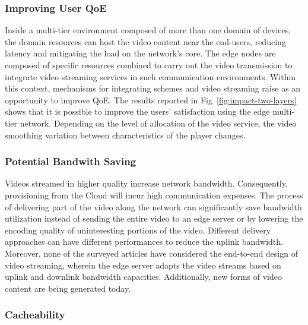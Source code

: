 \subsubsection{Improving User QoE}

Inside a multi-tier environment composed of more than one domain of devices, the domain resources can host the video content near the end-users, reducing latency and mitigating the load on the network's core. The edge nodes are composed of specific resources combined to carry out the video transmission to integrate video streaming services in such communication environments. Within this context, mechanisms for integrating schemes and video streaming raise as an opportunity to improve QoE.%
The results reported in Fig~\ref{fig:impact-two-layers} shows that it is possible to improve the users' satisfaction using the edge multi-tier network. Depending on the level of allocation of the video service, the video smoothing variation between characteristics of the player changes.


\subsubsection{Potential Bandwith Saving}

Videos streamed in higher quality increase network bandwidth. Consequently, provisioning from the Cloud will incur high communication expenses. 
The process of delivering part of the video along the network can significantly save bandwidth utilization instead of sending the entire video to an edge server or by lowering the encoding quality of uninteresting portions of the video. Different delivery approaches can have different performances to reduce the uplink bandwidth. Moreover, none of the surveyed articles have considered the end-to-end design of video streaming, wherein the edge server adapts the video streams based on uplink and downlink bandwidth capacities. Additionally, new forms of video content are being generated today.


\subsubsection{Cacheability}

